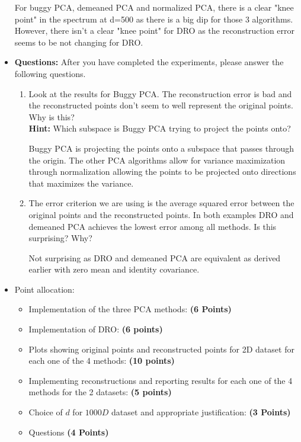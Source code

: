 \documentclass[a4paper]{article}
\newcounter{thm}
\theoremstyle{definition}
\newenvironment{soln}{
    \leavevmode\color{blue}\ignorespaces
}{}
\begin{document}
\begin{itemize}
\begin{soln}
\begin{figure}[h]
    \end{figure}
    For buggy PCA, demeaned PCA and normalized PCA, there is a clear "knee point" in the spectrum at d=500 as there is a big dip for those 3 algorithms. However, there isn't a clear "knee point" for DRO as the reconstruction error seems to be not changing for DRO.
\end{soln}

\item \textbf{Questions:} After you have completed the experiments, please answer the following questions.
\begin{enumerate}
\item Look at the results for Buggy PCA. The reconstruction error is bad and the
reconstructed points don't seem to well represent the original points. Why is
this? \\
\textbf{Hint: } Which subspace is Buggy PCA trying to project the points
onto? \\
\begin{soln}
    Buggy PCA is projecting the points onto a subspace that passes through the origin. The other PCA algorithms allow for variance maximization through normalization allowing the points to be projected onto directions that maximizes the variance.
\end{soln}
\item The error criterion we are using is the average squared error 
between the original points and the reconstructed points.
In both examples DRO and demeaned PCA achieves the lowest error among all
methods. 
Is this surprising? Why? \\
\begin{soln}
    Not surprising as DRO and demeaned PCA are equivalent as derived earlier with zero mean and identity covariance.
\end{soln}
\end{enumerate}

\item Point allocation:
\begin{itemize}
\item Implementation of the three PCA methods: \textbf{(6 Points)}
\item Implementation of DRO: \textbf{(6 points)}
\item Plots showing original points and reconstructed points for 2D dataset for each one of the 4 methods: \textbf{(10 points)}
\item Implementing reconstructions and reporting results for each one of the 4 methods for the 2 datasets: \textbf{(5 points)}
\item Choice of $d$ for $1000D$ dataset and appropriate justification:
\textbf{(3 Points)}
\item Questions \textbf{(4 Points)}
\end{itemize}

\end{itemize}









\end{document}
